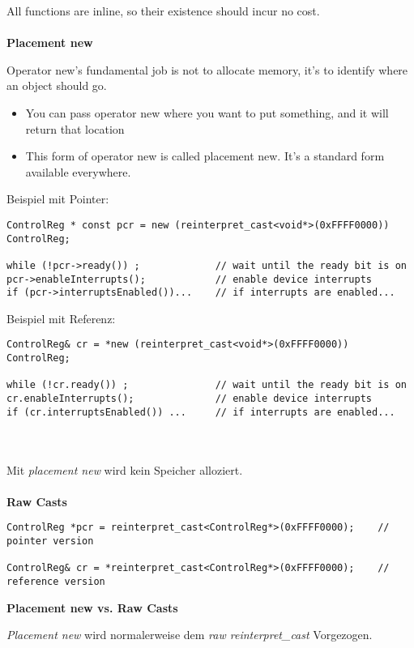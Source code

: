 All functions are inline, so their existence should incur no cost.\\ \\

\textbf{Placement new}

Operator new’s fundamental job is not to allocate memory, it’s to identify where an object should go.

\begin{itemize}
	\item You can pass operator new where you want to put something, and it will return that location
	\item This form of operator new is called placement new.
			It’s a standard form available everywhere.
	
\end{itemize}

Beispiel mit Pointer:
\begin{lstlisting}
ControlReg * const pcr = new (reinterpret_cast<void*>(0xFFFF0000)) ControlReg;

while (!pcr->ready()) ; 			// wait until the ready bit is on
pcr->enableInterrupts(); 			// enable device interrupts
if (pcr->interruptsEnabled())... 	// if interrupts are enabled...

\end{lstlisting}

Beispiel mit Referenz:
\begin{lstlisting}
ControlReg& cr = *new (reinterpret_cast<void*>(0xFFFF0000)) ControlReg;

while (!cr.ready()) ; 				// wait until the ready bit is on
cr.enableInterrupts(); 				// enable device interrupts
if (cr.interruptsEnabled()) ... 	// if interrupts are enabled...
\end{lstlisting}
\hspace*{\fill} \\\\
Mit \textit{placement new} wird kein Speicher alloziert.\\ \\

\textbf{Raw Casts}
\begin{lstlisting}
ControlReg *pcr = reinterpret_cast<ControlReg*>(0xFFFF0000);	// pointer version

ControlReg& cr = *reinterpret_cast<ControlReg*>(0xFFFF0000);	// reference version
\end{lstlisting}


\textbf{Placement new vs. Raw Casts}


\textit{Placement new} wird normalerweise dem \textit{ raw reinterpret\_cast} Vorgezogen.


